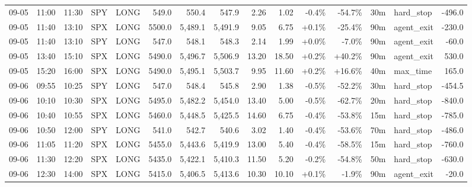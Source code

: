 \documentclass[11pt,a4paper,twoside]{article}
\begin{document}
\begin{landscape}
\begin{center}
\begin{longtable}{>{\color{txtmain}}l l l l l r r r r r r r r >{\color{txtmain}}l r}
09-05 & 11:00 & 11:30 & SPY & LONG & 549.0 & 550.4 & 547.9 & 2.26 & 1.02 & \textcolor{lossred}{-0.4\%} & \textcolor{lossred}{-54.7\%} & 30m & hard\_stop & \textcolor{lossred}{-496.0} \\
09-05 & 11:40 & 13:10 & SPX & LONG & 5500.0 & 5,489.1 & 5,491.9 & 9.05 & 6.75 & \textcolor{wingreen}{+0.1\%} & \textcolor{lossred}{-25.4\%} & 90m & agent\_exit & \textcolor{lossred}{-230.0} \\
09-05 & 11:40 & 13:10 & SPY & LONG & 547.0 & 548.1 & 548.3 & 2.14 & 1.99 & \textcolor{wingreen}{+0.0\%} & \textcolor{lossred}{-7.0\%} & 90m & agent\_exit & \textcolor{lossred}{-60.0} \\
09-05 & 13:40 & 15:10 & SPX & LONG & 5490.0 & 5,496.7 & 5,506.9 & 13.20 & 18.50 & \textcolor{wingreen}{+0.2\%} & \textcolor{wingreen}{+40.2\%} & 90m & agent\_exit & \textcolor{wingreen}{530.0} \\
09-05 & 15:20 & 16:00 & SPX & LONG & 5490.0 & 5,495.1 & 5,503.7 & 9.95 & 11.60 & \textcolor{wingreen}{+0.2\%} & \textcolor{wingreen}{+16.6\%} & 40m & max\_time & \textcolor{wingreen}{165.0} \\
09-06 & 09:55 & 10:25 & SPY & LONG & 547.0 & 548.4 & 545.8 & 2.90 & 1.38 & \textcolor{lossred}{-0.5\%} & \textcolor{lossred}{-52.2\%} & 30m & hard\_stop & \textcolor{lossred}{-454.5} \\
09-06 & 10:10 & 10:30 & SPX & LONG & 5495.0 & 5,482.2 & 5,454.0 & 13.40 & 5.00 & \textcolor{lossred}{-0.5\%} & \textcolor{lossred}{-62.7\%} & 20m & hard\_stop & \textcolor{lossred}{-840.0} \\
09-06 & 10:40 & 10:55 & SPX & LONG & 5460.0 & 5,448.5 & 5,425.5 & 14.60 & 6.75 & \textcolor{lossred}{-0.4\%} & \textcolor{lossred}{-53.8\%} & 15m & hard\_stop & \textcolor{lossred}{-785.0} \\
09-06 & 10:50 & 12:00 & SPY & LONG & 541.0 & 542.7 & 540.6 & 3.02 & 1.40 & \textcolor{lossred}{-0.4\%} & \textcolor{lossred}{-53.6\%} & 70m & hard\_stop & \textcolor{lossred}{-486.0} \\
09-06 & 11:05 & 11:20 & SPX & LONG & 5455.0 & 5,443.6 & 5,419.9 & 13.00 & 5.40 & \textcolor{lossred}{-0.4\%} & \textcolor{lossred}{-58.5\%} & 15m & hard\_stop & \textcolor{lossred}{-760.0} \\
09-06 & 11:30 & 12:20 & SPX & LONG & 5435.0 & 5,422.1 & 5,410.3 & 11.50 & 5.20 & \textcolor{lossred}{-0.2\%} & \textcolor{lossred}{-54.8\%} & 50m & hard\_stop & \textcolor{lossred}{-630.0} \\
09-06 & 12:30 & 14:00 & SPX & LONG & 5415.0 & 5,406.5 & 5,413.6 & 10.30 & 10.10 & \textcolor{wingreen}{+0.1\%} & \textcolor{lossred}{-1.9\%} & 90m & agent\_exit & \textcolor{lossred}{-20.0} \\

\end{longtable}
\end{center}
\end{landscape}
\end{document}
